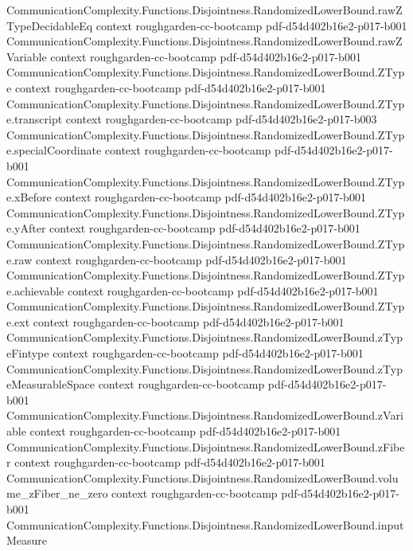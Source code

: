 \begin{theorem}
\proofstep
  {CommunicationComplexity.Functions.Disjointness.RandomizedLowerBound.rawZTypeDecidableEq}
  {context}
  {roughgarden-cc-bootcamp}
  {pdf-d54d402b16e2-p017-b001}
\proofstep
  {CommunicationComplexity.Functions.Disjointness.RandomizedLowerBound.rawZVariable}
  {context}
  {roughgarden-cc-bootcamp}
  {pdf-d54d402b16e2-p017-b001}
\proofstep
  {CommunicationComplexity.Functions.Disjointness.RandomizedLowerBound.ZType}
  {context}
  {roughgarden-cc-bootcamp}
  {pdf-d54d402b16e2-p017-b001}
\proofstep
  {CommunicationComplexity.Functions.Disjointness.RandomizedLowerBound.ZType.transcript}
  {context}
  {roughgarden-cc-bootcamp}
  {pdf-d54d402b16e2-p017-b003}
\proofstep
  {CommunicationComplexity.Functions.Disjointness.RandomizedLowerBound.ZType.specialCoordinate}
  {context}
  {roughgarden-cc-bootcamp}
  {pdf-d54d402b16e2-p017-b001}
\proofstep
  {CommunicationComplexity.Functions.Disjointness.RandomizedLowerBound.ZType.xBefore}
  {context}
  {roughgarden-cc-bootcamp}
  {pdf-d54d402b16e2-p017-b001}
\proofstep
  {CommunicationComplexity.Functions.Disjointness.RandomizedLowerBound.ZType.yAfter}
  {context}
  {roughgarden-cc-bootcamp}
  {pdf-d54d402b16e2-p017-b001}
\proofstep
  {CommunicationComplexity.Functions.Disjointness.RandomizedLowerBound.ZType.raw}
  {context}
  {roughgarden-cc-bootcamp}
  {pdf-d54d402b16e2-p017-b001}
\proofstep
  {CommunicationComplexity.Functions.Disjointness.RandomizedLowerBound.ZType.achievable}
  {context}
  {roughgarden-cc-bootcamp}
  {pdf-d54d402b16e2-p017-b001}
\proofstep
  {CommunicationComplexity.Functions.Disjointness.RandomizedLowerBound.ZType.ext}
  {context}
  {roughgarden-cc-bootcamp}
  {pdf-d54d402b16e2-p017-b001}
\proofstep
  {CommunicationComplexity.Functions.Disjointness.RandomizedLowerBound.zTypeFintype}
  {context}
  {roughgarden-cc-bootcamp}
  {pdf-d54d402b16e2-p017-b001}
\proofstep
  {CommunicationComplexity.Functions.Disjointness.RandomizedLowerBound.zTypeMeasurableSpace}
  {context}
  {roughgarden-cc-bootcamp}
  {pdf-d54d402b16e2-p017-b001}
\proofstep
  {CommunicationComplexity.Functions.Disjointness.RandomizedLowerBound.zVariable}
  {context}
  {roughgarden-cc-bootcamp}
  {pdf-d54d402b16e2-p017-b001}
\proofstep
  {CommunicationComplexity.Functions.Disjointness.RandomizedLowerBound.zFiber}
  {context}
  {roughgarden-cc-bootcamp}
  {pdf-d54d402b16e2-p017-b001}
\proofstep
  {CommunicationComplexity.Functions.Disjointness.RandomizedLowerBound.volume_zFiber_ne_zero}
  {context}
  {roughgarden-cc-bootcamp}
  {pdf-d54d402b16e2-p017-b001}
\proofstep
  {CommunicationComplexity.Functions.Disjointness.RandomizedLowerBound.inputMeasure}

\end{theorem}
